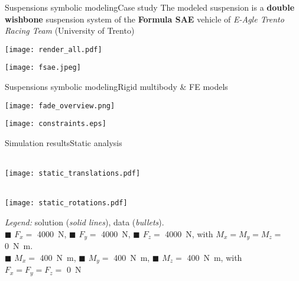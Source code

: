 \begin{frame}{Suspensions symbolic modeling}{Case study}
  The modeled suspension is a \textbf{double wishbone} suspension system of the \textbf{Formula SAE} vehicle of \emph{E-Agle Trento Racing Team} (University of Trento) \\[1.0em]
  \begin{center}
    \begin{minipage}[c]{0.65\textwidth}
      \centering
      \texttt{[image: render\_all.pdf]}
    \end{minipage}
    \hspace*{1em}
    \begin{minipage}[c]{0.25\textwidth}
      \centering
      \texttt{[image: fsae.jpeg]}
    \end{minipage}
  \end{center}
\end{frame}

\begin{frame}{Suspensions symbolic modeling}{Rigid multibody \& FE models}
  \begin{minipage}[c]{0.55\linewidth}
    \texttt{[image: fade\_overview.png]}\\
  \end{minipage}
  \begin{minipage}[c]{0.40\linewidth}
    \texttt{[image: constraints.eps]}
  \end{minipage}
\end{frame}

\begin{frame}{Simulation results}{Static analysis}
  \vspace{-1.75em}
  \begin{center}
    \begin{minipage}[c]{0.485\linewidth}
       \\[0.2em]
      \texttt{[image: static\_translations.pdf]}
    \end{minipage}
    \begin{minipage}[c]{0.485\linewidth}
       \\[0.2em]
      \texttt{[image: static\_rotations.pdf]}
    \end{minipage}
    \raggedright{\footnotesize{\emph{Legend:} \TrussMe{} solution (\emph{solid lines}), \Ansys{} data (\emph{bullets}). \\ {\color{mycolor1}$\blacksquare$} $F_x =$ \SI{4000}{\newton}, {\color{mycolor2}$\blacksquare$} $F_y =$ \SI{4000}{\newton}, {\color{mycolor3}$\blacksquare$} $F_z =$ \SI{4000}{\newton}, with $M_x = M_y = M_z =$ \SI{0}{\newton\meter}. \\ {\color{mycolor4}$\blacksquare$} $M_x =$ \SI{400}{\newton\meter}, {\color{mycolor5}$\blacksquare$} $M_y =$ \SI{400}{\newton\meter}, {\color{mycolor6}$\blacksquare$} $M_z =$ \SI{400}{\newton\meter}, with $F_x = F_y = F_z =$ \SI{0}{\newton}}}
  \end{center}
\end{frame}


